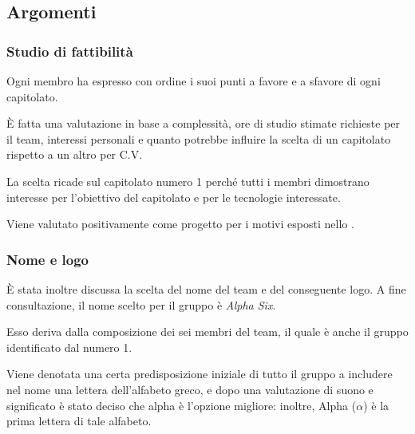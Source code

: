         \subsection{Argomenti}
            \subsubsection{Studio di fattibilità}
            Ogni membro ha espresso con ordine i suoi punti a favore e a sfavore di ogni capitolato.\par
            È fatta una valutazione in base a complessità, ore di studio stimate richieste per il team, interessi personali e
            quanto potrebbe influire la scelta di un capitolato rispetto a un altro per C.V.\par
            La scelta ricade sul capitolato numero 1 perché tutti i membri dimostrano interesse per l'obiettivo del capitolato
            e per le tecnologie interessate.\par
            Viene valutato positivamente come progetto per i motivi esposti nello \Doc{\SdFv}.

            \subsubsection{Nome e logo}
            È stata inoltre discussa la scelta del nome del team e del conseguente logo. A fine consultazione, il nome scelto
            per il gruppo è \textit{Alpha Six}.\par
            Esso deriva dalla composizione dei sei membri del team, il quale è anche il gruppo identificato dal numero 1.\par
            Viene denotata una certa predisposizione iniziale di tutto il gruppo a includere nel nome una lettera dell'alfabeto greco,
            e dopo una valutazione di suono e significato è stato deciso che alpha è l'opzione migliore: inoltre, Alpha ($\alpha$) è
            la prima lettera di tale alfabeto.


